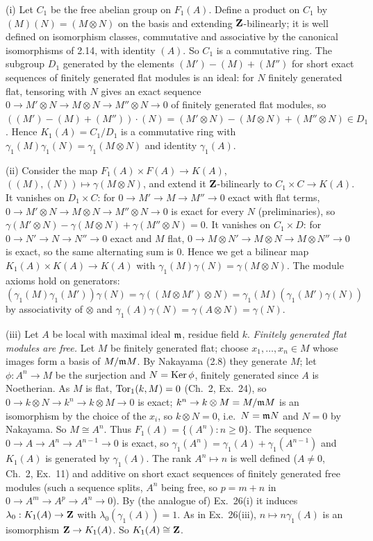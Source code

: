 \documentclass[11pt]{article}
\begin{document}
(i) Let $C_1$ be the free abelian group on $F_1(A)$. Define a product on $C_1$ by $(M)(N)=(M\otimes N)$ on the basis and extending $\mathbf Z$-bilinearly; it is well defined on isomorphism classes, commutative and associative by the canonical isomorphisms of 2.14, with identity $(A)$. So $C_1$ is a commutative ring. The subgroup $D_1$ generated by the elements $(M')-(M)+(M'')$ for short exact sequences of finitely generated flat modules is an ideal: for $N$ finitely generated flat, tensoring with $N$ gives an exact sequence $0\to M'\otimes N\to M\otimes N\to M''\otimes N\to0$ of finitely generated flat modules, so $((M')-(M)+(M''))\cdot(N)=(M'\otimes N)-(M\otimes N)+(M''\otimes N)\in D_1$. Hence $K_1(A)=C_1/D_1$ is a commutative ring with $\gamma_1(M)\gamma_1(N)=\gamma_1(M\otimes N)$ and identity $\gamma_1(A)$.

(ii) Consider the map $F_1(A)\times F(A)\to K(A)$, $((M),(N))\mapsto\gamma(M\otimes N)$, and extend it $\mathbf Z$-bilinearly to $C_1\times C\to K(A)$. It vanishes on $D_1\times C$: for $0\to M'\to M\to M''\to0$ exact with flat terms, $0\to M'\otimes N\to M\otimes N\to M''\otimes N\to0$ is exact for every $N$ (preliminaries), so $\gamma(M'\otimes N)-\gamma(M\otimes N)+\gamma(M''\otimes N)=0$. It vanishes on $C_1\times D$: for $0\to N'\to N\to N''\to0$ exact and $M$ flat, $0\to M\otimes N'\to M\otimes N\to M\otimes N''\to0$ is exact, so the same alternating sum is $0$. Hence we get a bilinear map $K_1(A)\times K(A)\to K(A)$ with $\gamma_1(M)\gamma(N)=\gamma(M\otimes N)$. The module axioms hold on generators: $(\gamma_1(M)\gamma_1(M'))\gamma(N)=\gamma((M\otimes M')\otimes N)=\gamma_1(M)(\gamma_1(M')\gamma(N))$ by associativity of $\otimes$ and $\gamma_1(A)\gamma(N)=\gamma(A\otimes N)=\gamma(N)$.

(iii) Let $A$ be local with maximal ideal $\mathfrak m$, residue field $k$. \emph{Finitely generated flat modules are free.} Let $M$ be finitely generated flat; choose $x_1,\dots,x_n\in M$ whose images form a basis of $M/\mathfrak m M$. By Nakayama (2.8) they generate $M$; let $\phi:A^n\to M$ be the surjection and $N=\operatorname{Ker}\phi$, finitely generated since $A$ is Noetherian. As $M$ is flat, $\operatorname{Tor}_1(k,M)=0$ (Ch.~2, Ex.~24), so $0\to k\otimes N\to k^n\to k\otimes M\to0$ is exact; $k^n\to k\otimes M=M/\mathfrak m M$ is an isomorphism by the choice of the $x_i$, so $k\otimes N=0$, i.e.\ $N=\mathfrak m N$ and $N=0$ by Nakayama. So $M\cong A^n$.
Thus $F_1(A)=\{(A^n):n\ge0\}$. The sequence $0\to A\to A^n\to A^{n-1}\to0$ is exact, so $\gamma_1(A^n)=\gamma_1(A)+\gamma_1(A^{n-1})$ and $K_1(A)$ is generated by $\gamma_1(A)$. The rank $A^n\mapsto n$ is well defined ($A\ne0$, Ch.~2, Ex.~11) and additive on short exact sequences of finitely generated free modules (such a sequence splits, $A^n$ being free, so $p=m+n$ in $0\to A^m\to A^p\to A^n\to0$). By (the analogue of) Ex.~26(i) it induces $\lambda_0:K_1(A)\to\mathbf Z$ with $\lambda_0(\gamma_1(A))=1$. As in Ex.~26(iii), $n\mapsto n\gamma_1(A)$ is an isomorphism $\mathbf Z\to K_1(A)$. So $K_1(A)\cong\mathbf Z$.
\end{document}
